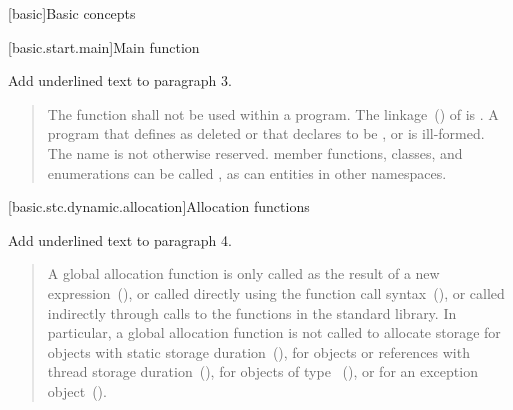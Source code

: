 
\setcounter{chapter}{2}
[basic]{Basic concepts}

\setcounter{section}{6}

[basic.start.main]{Main function}

Add underlined text to paragraph 3.

\begin{quote}
	\setcounter{Paras}{2}

\pnum
The function  shall not be used within
a program.
%
The linkage~() of  is
. A program that defines  as
deleted or that declares  to be
 , or  is ill-formed. 
The name  is
not otherwise reserved. \enterexample member functions, classes, and
enumerations can be called , as can entities in other
namespaces. \exitexample
\end{quote}

\cbstart
\setcounter{section}{7}
\setcounter{subsection}{4}
[basic.stc.dynamic.allocation]{Allocation functions}

Add underlined text to paragraph 4.

\begin{quote}
	\setcounter{Paras}{3}
\pnum
A global allocation function is only called as the result of a new
expression~(), or called directly using the function call
syntax~(), 
or called indirectly through calls to the
functions in the \Cpp standard library. \enternote In particular, a
global allocation function is not called to allocate storage for objects
with static storage duration~(), for objects or references
with thread storage duration~(), for objects of
type ~(), or for an
exception object~().
\exitnote
\end{quote}
\cbend


